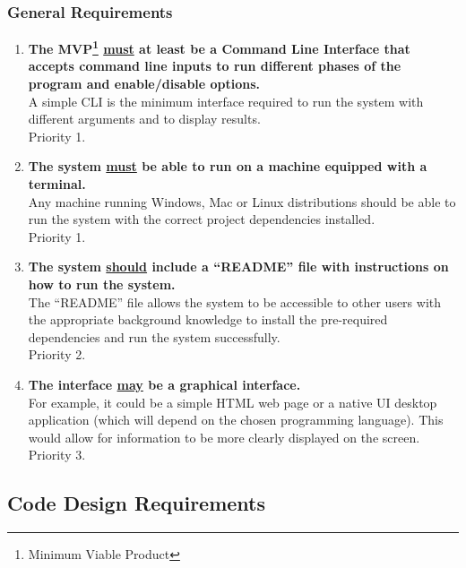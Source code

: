 \subsubsection{General Requirements}

\begin{enumerate}[label=F\arabic*,resume]

    \item \textbf{The MVP\footnote{Minimum Viable Product} \underline{must} at least be a Command Line Interface that accepts command line inputs to run different phases of the program and enable/disable options.}\\
    A simple CLI is the minimum interface required to run the system with different arguments and to display results.\\
    Priority 1.
    
    \item \textbf{The system \underline{must} be able to run on a machine equipped with a terminal.}\\
    Any machine running Windows, Mac or Linux distributions should be able to run the system with the correct project dependencies installed.\\
    Priority 1.
        
    \item \textbf{The system \underline{should} include a ``README'' file with instructions on how to run the system.}\\
    The ``README'' file allows the system to be accessible to other users with the appropriate background knowledge to install the pre-required dependencies and run the system successfully.\\
    Priority 2.
    
    \item \textbf{The interface \underline{may} be a graphical interface.}\\
    For example, it could be a simple HTML web page or a native UI desktop application (which will depend on the chosen programming language). This would allow for information to be more clearly displayed on the screen.\\
    Priority 3.
        
\end{enumerate}

\subsection{Code Design Requirements}

